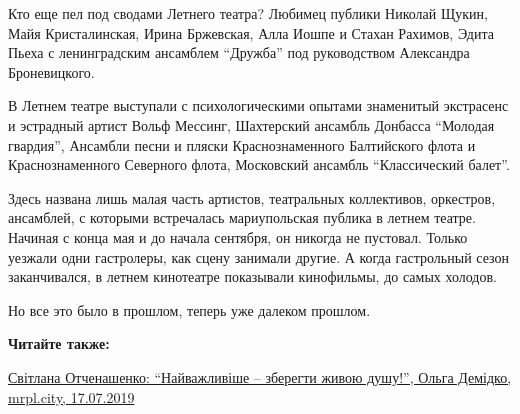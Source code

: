 Кто еще пел под сводами Летнего театра? Любимец публики Николай Щукин, Майя
Кристалинская, Ирина Бржевская, Алла Иошпе и Стахан Рахимов, Эдита Пьеха с
ленинградским ансамблем \enquote{Дружба} под руководством Александра Броневицкого.

В Летнем театре выступали с психологическими опытами знаменитый экстрасенс и
эстрадный артист Вольф Мессинг, Шахтерский ансамбль Донбасса \enquote{Молодая гвардия},
Ансамбли песни и пляски Краснознаменного Балтийского флота и Краснознаменного
Северного флота, Московский ансамбль \enquote{Классический балет}.

Здесь названа лишь малая часть артистов, театральных коллективов, оркестров,
ансамблей, с которыми встречалась мариупольская публика в летнем театре.
Начиная с конца мая и до начала сентября, он никогда не пустовал. Только
уезжали одни гастролеры, как сцену занимали другие. А когда гастрольный сезон
заканчивался, в летнем кинотеатре показывали кинофильмы, до самых холодов.

Но все это было в прошлом, теперь уже далеком прошлом.

\textbf{Читайте также:} 

\href{https://mrpl.city/blogs/view/svitlana-otchenashenko-najvazhlivishezberegti-zhivoyu-dushu}{%
Світлана Отченашенко: \enquote{Найважливіше – зберегти живою душу!}, Ольга Демідко, mrpl.city, 17.07.2019}

